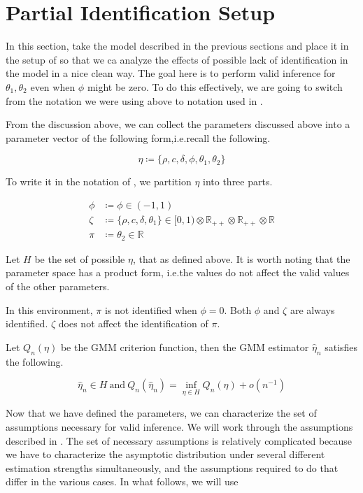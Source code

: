 \documentclass[11pt]{article}
\newcommand*{\R}{\mathbb{R}}
\newcommand*{\Eta}{H}
\begin{document}
\section{Partial Identification Setup}

In this section, take the model described in the previous sections and place it in the setup of
\textcite{andrewsGmm2014} so that we ca analyze the effects of possible lack of identification in the model in a
nice clean way.
The goal here is to perform valid inference for $\theta_1, \theta_2$ even when $\phi$ might be zero. 
To do this effectively, we are going to switch from the notation we were using above to notation used in
\textcite{andrewsGmm2014}. 


From the discussion above, we can collect the parameters discussed above into a parameter vector of the following
form,i.e.\@ recall the following.

\begin{equation}
    \eta \coloneqq \lbrace \rho, c, \delta, \phi, \theta_1, \theta_2 \rbrace
\end{equation}

To write it in the notation of \textcite{andrewsGmm2014}, we partition $\eta$ into three parts.

\begin{align}
    \phi &\coloneqq \phi  \in (-1, 1) \\ 
    \zeta &\coloneqq \lbrace \rho, c, \delta, \theta_1 \rbrace \in [0,1) \otimes \R_{++} \otimes \R_{++} \otimes
    \R  \\
    \pi &\coloneqq \theta_2 \in \R 
\end{align}

Let $\Eta$ be the set of possible $\eta$, that as defined above.
It is worth noting that the parameter space has a product form, i.e.\@ the values do not affect the valid values
of the other parameters.

In this environment, $\pi$ is not identified when $\phi = 0$.
Both $\phi$ and $\zeta$ are always identified.
$\zeta$ does not affect the identification of $\pi$.

Let $Q_n(\eta)$ be the GMM criterion function, then the GMM estimator $\hat{\eta}_n$ satisfies the following.


\begin{equation}
    \hat{\eta}_n \in \Eta\ \text{and}\ Q_n(\hat{\eta}_n) = \inf_{\eta \in \Eta} Q_n(\eta) +
    o\left(n^{-1}\right) 
\end{equation}


Now that we have defined the parameters, we can characterize the set of assumptions necessary for valid inference.
We will work through the assumptions described in \textcite{andrewsGmm2014}.
The set of necessary assumptions is relatively complicated because we have to characterize the asymptotic
distribution under several different estimation strengths simultaneously, and the assumptions required to do that
  differ in the various cases. 
In what follows, we will use 
\end{document}
